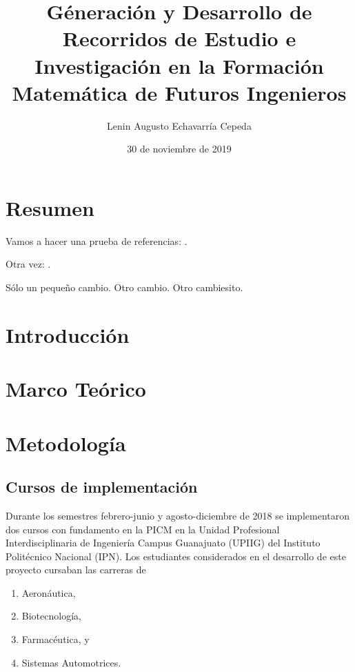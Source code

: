 \documentclass[spanish,]{book}
\title{Géneración y Desarrollo de Recorridos de Estudio e Investigación en la Formación Matemática de Futuros Ingenieros}
\author{Lenin Augusto Echavarría Cepeda}
\date{30 de noviembre de 2019}
\providecommand{\tightlist}{%
  \setlength{\itemsep}{0pt}\setlength{\parskip}{0pt}}
\begin{document}
\maketitle

{
\setcounter{tocdepth}{1}
\tableofcontents
}
\hypertarget{resumen}{%
\chapter*{Resumen}\label{resumen}}

Vamos a hacer una prueba de referencias: \citep{Barquero2018, Bartolome2018}.

Otra vez: \citep{Barquero2018, Bartolome2018}.

Sólo un pequeño cambio. Otro cambio. Otro cambiesito.

\hypertarget{introducciuxf3n}{%
\chapter{Introducción}\label{introducciuxf3n}}

\hypertarget{marco-teuxf3rico}{%
\chapter{Marco Teórico}\label{marco-teuxf3rico}}

\hypertarget{metodologuxeda}{%
\chapter{Metodología}\label{metodologuxeda}}

\hypertarget{cursos-de-implementaciuxf3n}{%
\section{Cursos de implementación}\label{cursos-de-implementaciuxf3n}}

Durante los semestres febrero-junio y agosto-diciembre de 2018 se implementaron dos cursos con fundamento en la PICM en la Unidad Profesional Interdisciplinaria de Ingeniería Campus Guanajuato (UPIIG) del Instituto Politécnico Nacional (IPN). Los estudiantes considerados en el desarrollo de este proyecto cursaban las carreras de

\begin{enumerate}
\def\labelenumi{\arabic{enumi}.}
\tightlist
\item
  Aeronáutica,
\item
  Biotecnología,
\item
  Farmacéutica, y
\item
  Sistemas Automotrices.
\end{enumerate}
\end{document}
